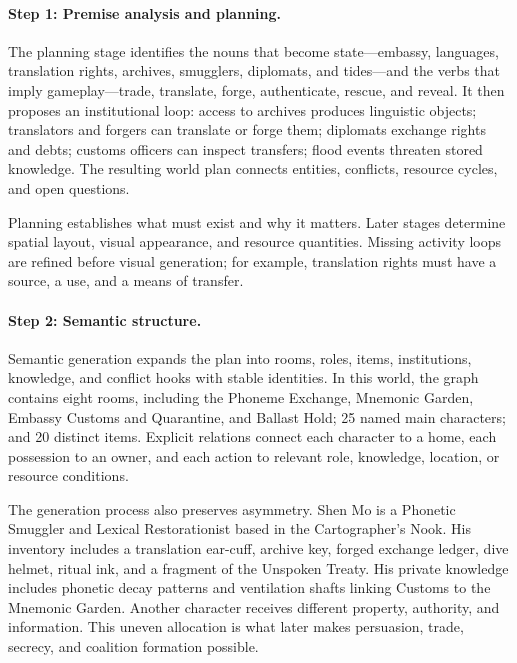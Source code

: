 \documentclass[10pt,twocolumn]{article}
\begin{document}
\paragraph{Step 1: Premise analysis and planning.}
The planning stage identifies the nouns that become state---embassy,
languages, translation rights, archives, smugglers, diplomats, and tides---and
the verbs that imply gameplay---trade, translate, forge, authenticate, rescue,
and reveal. It then proposes an institutional loop: access to archives produces
linguistic objects; translators and forgers can
translate or forge them; diplomats exchange rights and debts; customs officers
can inspect transfers; flood events threaten stored knowledge. The resulting
world plan connects entities, conflicts, resource cycles, and open questions.

Planning establishes what must exist and why it matters. Later stages determine
spatial layout, visual appearance, and resource quantities. Missing activity
loops are refined before visual generation; for example, translation rights
must have a source, a use, and a means of transfer.

\paragraph{Step 2: Semantic structure.}
Semantic generation expands the plan into rooms, roles, items, institutions,
knowledge, and conflict hooks with stable identities. In this world,
the graph contains eight rooms, including the Phoneme Exchange, Mnemonic
Garden, Embassy Customs and Quarantine, and Ballast Hold; 25 named main
characters; and 20 distinct items. Explicit relations connect each character to
a home, each possession to an owner, and each action to relevant role,
knowledge, location, or resource conditions.

The generation process also preserves asymmetry. Shen Mo is a Phonetic
Smuggler and Lexical Restorationist based in the Cartographer's Nook. His
inventory includes a translation ear-cuff, archive key, forged exchange ledger,
dive helmet, ritual ink, and a fragment of the Unspoken Treaty. His private
knowledge includes phonetic decay patterns and ventilation shafts linking
Customs to the Mnemonic Garden. Another character receives different property,
authority, and information. This uneven allocation is what later makes
persuasion, trade, secrecy, and coalition formation possible.
\end{document}
